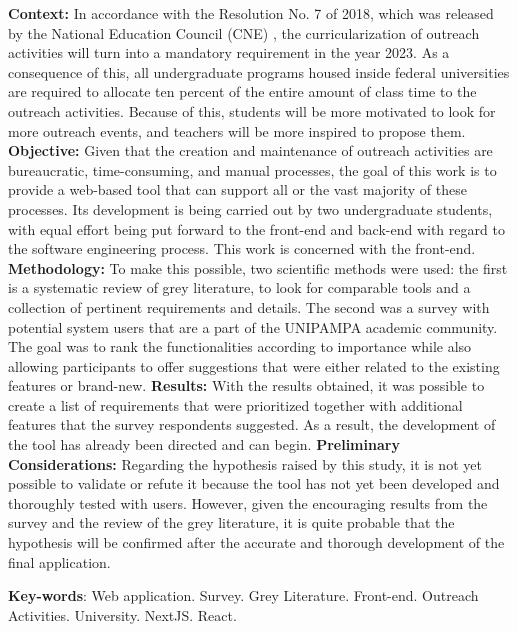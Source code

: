 \begin{resumo}[Abstract]
  \textbf{Context:} In accordance with the Resolution No. 7 of 2018, which was released by the National Education Council (CNE) \cite{Resolucao-MEC:2018}, the curricularization of outreach activities will turn into a mandatory requirement in the year 2023. As a consequence of this, all undergraduate programs housed inside federal universities are required to allocate ten percent of the entire amount of class time to the outreach activities. Because of this, students will be more motivated to look for more outreach events, and teachers will be more inspired to propose them. \textbf{Objective:} Given that the creation and maintenance of outreach activities are bureaucratic, time-consuming, and manual processes, the goal of this work is to provide a web-based tool that can support all or the vast majority of these processes. Its development is being carried out by two undergraduate students, with equal effort being put forward to the front-end and back-end with regard to the software engineering process. This work is concerned with the front-end. \textbf{Methodology:} To make this possible, two scientific methods were used: the first is a systematic review of grey literature, to look for comparable tools and a collection of pertinent requirements and details. The second was a survey with potential system users that are a part of the UNIPAMPA academic community. The goal was to rank the functionalities according to importance while also allowing participants to offer suggestions that were either related to the existing features or brand-new. \textbf{Results:} With the results obtained, it was possible to create a list of requirements that were prioritized together with additional features that the survey respondents suggested. As a result, the development of the tool has already been directed and can begin. \textbf{Preliminary Considerations:} Regarding the hypothesis raised by this study, it is not yet possible to validate or refute it because the tool has not yet been developed and thoroughly tested with users. However, given the encouraging results from the survey and the review of the grey literature, it is quite probable that the hypothesis will be confirmed after the accurate and thorough development of the final application.

  \vspace{\onelineskip}

  \noindent
  \textbf{Key-words}: Web application. Survey. Grey Literature. Front-end. Outreach Activities. University. NextJS. React.
\end{resumo}
